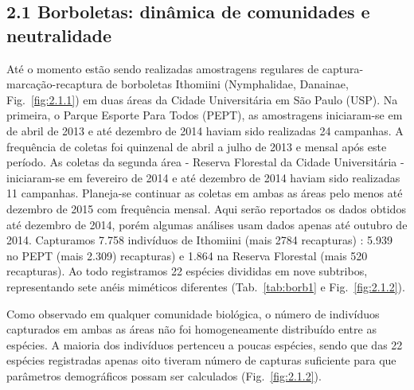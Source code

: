 \subsection{2.1 Borboletas: dinâmica de comunidades e neutralidade} %
\label{sec:dinamica-temporal-borb} 
Até o momento estão sendo realizadas amostragens regulares de
captura-marcação-recaptura de borboletas Ithomiini (Nymphalidae,
Danainae, Fig.~\ref{fig:2.1.1}) 
em duas áreas da Cidade Universitária em São Paulo (USP). Na
primeira, o Parque Esporte Para Todos (PEPT), as amostragens
iniciaram-se em de abril de 2013 e até dezembro de 2014 haviam sido
realizadas 24 campanhas. A frequência de coletas foi
quinzenal de abril a julho de 2013 e mensal após este
período. As coletas da segunda área - Reserva
Florestal da Cidade Universitária - iniciaram-se em fevereiro de 2014
e até dezembro de 2014 haviam sido realizadas 11 campanhas. Planeja-se
continuar as coletas em ambas as áreas pelo menos até dezembro de 2015
com frequência mensal. Aqui serão reportados os dados obtidos até
dezembro de 2014, porém algumas análises usam dados apenas até outubro de 2014.
Capturamos 7.758 indivíduos de Ithomiini (mais 2784 recapturas) : 
5.939 no PEPT (mais 2.309) recapturas) e 1.864 na Reserva Florestal (mais 520 recapturas). 
Ao todo registramos 22 espécies divididas em nove subtribos, 
representando sete anéis miméticos diferentes (Tab.~\ref{tab:borb1} e Fig.~\ref{fig:2.1.2}).

Como observado em qualquer comunidade biológica, o número de
indivíduos capturados em ambas as áreas não foi homogeneamente
distribuído entre as espécies. A maioria dos indivíduos pertenceu a
poucas espécies, sendo que das 22 espécies registradas apenas oito
tiveram número de capturas
suficiente para que parâmetros demográficos possam ser calculados
(Fig.~\ref{fig:2.1.2}). 


